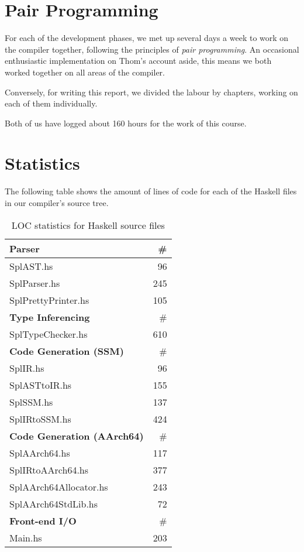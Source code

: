 \section{Pair Programming}

For each of the development phases, we met up several days a week to work on the compiler together, following the principles of \emph{pair programming}.
An occasional enthusiastic implementation on Thom's account aside, this means we both worked together on all areas of the compiler.

Conversely, for writing this report, we divided the labour by chapters, working on each of them individually.

Both of us have logged about 160 hours for the work of this course.


\section{Statistics}

The following table shows the amount of lines of code for each of the Haskell files in our compiler's source tree.

\begin{table}[ht!]
	\centering
	\begin{tabular}{|l|r|}
		\hline
		\textbf{Parser} 	& \# \\
		\hline
		SplAST.hs 			& 96 \\
		SplParser.hs 		& 245 \\
		SplPrettyPrinter.hs & 105 \\

		\hline
		\textbf{Type Inferencing} & \# \\
		\hline
		SplTypeChecker.hs 	& 610 \\

		\hline
		\textbf{Code Generation (SSM)} & \# \\
		\hline
		SplIR.hs 			& 96 \\
		SplASTtoIR.hs 		& 155 \\
		SplSSM.hs 			& 137 \\
		SplIRtoSSM.hs 		& 424 \\

		\hline
		\textbf{Code Generation (AArch64)} & \# \\
		\hline
		SplAArch64.hs 		& 117 \\
		SplIRtoAArch64.hs 	& 377 \\
		SplAArch64Allocator.hs & 243 \\
		SplAArch64StdLib.hs & 72 \\

		\hline
		\textbf{Front-end I/O} & \# \\
		\hline
		Main.hs 			& 203 \\
		\hline
	\end{tabular}
	\caption{LOC statistics for Haskell source files}
\end{table}
